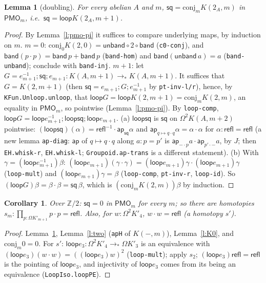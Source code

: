 \documentclass[11pt]{amsart}
\newtheorem{lemma}[theorem]{Lemma}
\newtheorem{corollary}[theorem]{Corollary}
\theoremstyle{definition}
\theoremstyle{remark}
\newcommand{\Om}{\Omega}
\newcommand{\Z}{\mathbb{Z}}
\newcommand{\code}[1]{\texttt{#1}}
\newcommand{\refl}{\mathsf{refl}}
\newcommand{\lp}{\mathsf{loop}}
\newcommand{\PMO}{\mathsf{PMO}}
\newcommand{\sq}{\mathsf{sq}}
\begin{document}
\begin{lemma}[doubling]\label{l:dbl}
For every abelian $A$ and $m$, $\sq=\mathrm{conj}_m K(2_A,m)$ in $\PMO_m$,
i.e.\ $\sq=\lp K(2_A,m{+}1)$.
\end{lemma}
\begin{proof}
By Lemma~\ref{l:pmo-pi} it suffices to compare underlying maps, by
induction on $m$.
$m=0$: $\mathrm{conj}_0K(2,0)=\mathsf{unband}\circ2\circ\mathsf{band}$
(\code{c0-conj}), and $\mathsf{band}(p\cdot p)=\mathsf{band}\,p+\mathsf{band}\,p$
(\code{band-hom}) and $\mathsf{band}(\mathsf{unband}\,a)=a$ (\code{band-unband}); conclude with \code{band-inj}.
$m+1$: let $G=e_{m+1}^{-1};\sq;e_{m+1}:K(A,m{+}1)\to_*K(A,m{+}1)$. It
suffices that $G=K(2,m{+}1)$ (then $\sq=e_{m+1};G;e_{m+1}^{-1}$ by
\code{pt-inv-l/r}), hence, by \code{KFun.Unloop.unloop}, that
$\lp G=\lp K(2,m{+}1)=\mathrm{conj}_mK(2,m)$, an equality in $\PMO_m$,
so pointwise (Lemma~\ref{l:pmo-pi}). By \code{loop-comp},
$\lp G=\lp e_{m+1}^{-1};\lp\sq;\lp e_{m+1}$. (a) $\lp\sq$ is $\sq$ on
$\Om^2K(A,m{+}2)$ pointwise: $(\lp\sq)(\alpha)=\refl^{-1}\cdot\mathsf{ap}_\sq\alpha$
and $\mathsf{ap}_{q\mapsto q\cdot q}\alpha=\alpha\cdot\alpha$ for
$\alpha:\refl=\refl$ (a new lemma \code{ap-diag}: $\mathsf{ap}$ of $q\mapsto q\cdot q$ along $a:p=p'$ is
$\mathsf{ap}_{-\cdot p}a\cdot\mathsf{ap}_{p'\cdot-}a$, by $J$; then \code{EH.whisk-r},
\code{EH.whisk-l}; \code{Groupoid.ap-trans} is a different statement).
(b) With $\gamma=(\lp e_{m+1}^{-1})\beta$:
$(\lp e_{m+1})(\gamma\cdot\gamma)=(\lp e_{m+1})\gamma\cdot(\lp e_{m+1})\gamma$
(\code{loop-mult}) and $(\lp e_{m+1})\gamma=\beta$ (\code{loop-comp},
\code{pt-inv-r}, \code{loop-id}). So $(\lp G)\beta=\beta\cdot\beta=\sq\,\beta$,
which is $(\mathrm{conj}_mK(2,m))\beta$ by induction.
\end{proof}

\begin{corollary}\label{c:sq0}
Over $\Z/2$: $\sq=0$ in $\PMO_m$ for every $m$; so there are homotopies
$s_m:\prod_{p:\Om K'_{m+1}}p\cdot p=\refl$. Also, for
$w:\Om^2K'_4$, $w\cdot w=\refl$ (a homotopy $s'$).
\end{corollary}
\begin{proof}
Lemma~\ref{l:dbl}, Lemma~\ref{l:two} (\code{apH} of $K(-,m)$), Lemma~\ref{l:K0},
and $\mathrm{conj}_m0=0$. For $s'$: $\lp e_3:\Om^2K'_4\to_*\Om K'_3$ is an
equivalence with $(\lp e_3)(w\cdot w)=((\lp e_3)w)^{2}$ (\code{loop-mult});
apply $s_2$; $(\lp e_3)\refl=\refl$ is the pointing of $\lp e_3$, and
injectivity of $\lp e_3$ comes from its being an equivalence (\code{LoopIso.loopPE}).
\end{proof}
\end{document}
